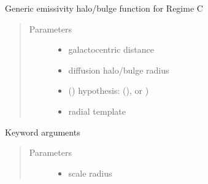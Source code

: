 \documentclass[letterpaper,10pt,english]{sphinxmanual}
\begin{document}

\begin{fulllineitems}
\label{\detokenize{diffsph.profiles:diffsph.profiles.hfactors.Hem_C}}
\sphinxAtStartPar
Generic emissivity halo/bulge function for Regime C
\begin{quote}\begin{description}
\item[{Parameters}] \leavevmode\begin{itemize}
\item {} 
\sphinxAtStartPar
{} \textendash{} galactocentric distance

\item {} 
\sphinxAtStartPar
{} \textendash{} diffusion halo/bulge radius

\item {} 
\sphinxAtStartPar
{} () \textendash{} hypothesis:  (),  or )

\item {} 
\sphinxAtStartPar
{} \textendash{} radial template

\end{itemize}

\end{description}\end{quote}

\sphinxAtStartPar
Keyword arguments
\begin{quote}\begin{description}
\item[{Parameters}] \leavevmode\begin{itemize}
\item {} 
\sphinxAtStartPar
{} \textendash{} scale radius


\end{itemize}
\end{description}
\end{quote}
\end{fulllineitems}
\end{document}
